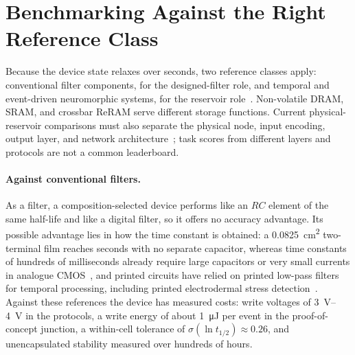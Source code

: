 \documentclass[12pt, twoside]{report}
\begin{document}
\section{Benchmarking Against the Right Reference Class}\label{sec:concl_benchmark}

Because the device state relaxes over seconds, two reference classes apply: conventional filter components, for the designed-filter role, and temporal and event-driven neuromorphic systems, for the reservoir role~\cite{Roy2019,IndiveriLiu2015,Tanaka2019}. Non-volatile DRAM, SRAM, and crossbar ReRAM serve different storage functions. Current physical-reservoir comparisons must also separate the physical node, input encoding, output layer, and network architecture~\cite{Liang2024PhysicalRC}; task scores from different layers and protocols are not a common leaderboard.

\paragraph{Against conventional filters.} As a filter, a composition-selected device performs like an $RC$ element of the same half-life and like a digital filter, so it offers no accuracy advantage. Its possible advantage lies in how the time constant is obtained: a \SI{0.0825}{\square\centi\metre} two-terminal film reaches seconds with no separate capacitor, whereas time constants of hundreds of milliseconds already require large capacitors or very small currents in analogue CMOS~\cite{IndiveriSandamirskaya2019}, and printed circuits have relied on printed low-pass filters for temporal processing, including printed electrodermal stress detection~\cite{Zhao2022PrintedEDA,Zhao2023PrintedFilters}. Against these references the device has measured costs: write voltages of \SIrange{3}{4}{\volt} in the \PEO{} protocols, a write energy of about \SI{1}{\micro\joule} per event in the proof-of-concept junction, a within-cell tolerance of \(\sigma(\ln t_{1/2})\approx\num{0.26}\), and unencapsulated stability measured over hundreds of hours.
\end{document}
